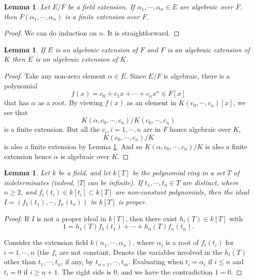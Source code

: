 \documentclass[12pt]{report}
\newtheorem{lemma}[theorem]{Lemma}
\theoremstyle{definition}
\begin{document}
\begin{lemma}\label{ac4}
	Let $E/F$ be a field extension. If $\alpha_1,\cdots,\alpha_n \in E$ are algebraic over $F$, then $F(\alpha_1,\cdots,\alpha_n)$  is a finite extension over $F$.
\end{lemma}

\begin{proof}
	We can do induction on $n$. It is straightforward.
\end{proof}

\begin{lemma}\label{ac3}
	If $E$ is an algebraic extension of $F$ and $F$ is an algebraic extension of $K$ then $E$ is an algebraic extension of $K$.
\end{lemma}

\begin{proof}
	Take any non-zero element $\alpha\in E$. Since $E/F$ is algebraic, there is a polynomial $$f(x)=c_0+c_1x+\cdots+c_n x^n\in F[x]$$ that has $\alpha$ as a root. By viewing $f(x)$ as an element in $K(c_0,\cdots,c_n)[x]$, we see that $$K(\alpha,c_0,\cdots,c_n)/K(c_0,\cdots,c_n)$$ is a finite extension. But all the $c_i, i=1,\cdots, n$ are in $F$ hence algebraic over $K$,$$K(c_0,\cdots,c_n)/K$$ is also a finite extension by Lemma \ref{ac4}. And so $K(\alpha,c_0,\cdots,c_n)/K$ is also a finite extension hence $\alpha$ is algebraic over $K$.
\end{proof}

\begin{lemma}\label{ac2}
	Let $k$ be a field, and let $k[T]$ be the polynomial ring in a set $T$ of indeterminates (indeed, $|T|$ can be infinite). If $t_1, \cdots, t_n \in T$ are distinct, where $n \geq 2$, and $f_i(t_i) \in k[t_i] \subset k[T]$ are non-constant polynomials, then the ideal $I = (f_1(t_1),\cdots, f_n(t_n))$ in $k[T]$ is proper.
\end{lemma}

\begin{proof}
	If $I$ is not a proper ideal in $k[T]$, then there exist $h_i(T) \in k[T]$ with $$ 1 = h_1(T)f_1(t_1) + \cdots + h_n(T)f_n(t_n).$$

	Consider the extension field $k(\alpha_1,\cdots,\alpha_n)$, where $\alpha_i$ is a root of $f_i(t_i)$ for $i = 1,\cdots , n$ (the $f_i$ are not constant. Denote the variables involved in the $h_i(T)$ other than $t_1,\cdots , t_n$, if any, by $t_{n+1}, \cdots , t_m$. Evaluating when $t_i = \alpha_i$ if $i \leq n$ and $t_i = 0$ if $i \geq n + 1$. The right side is 0, and we have the contradiction $1 = 0$.
\end{proof}
\end{document}

